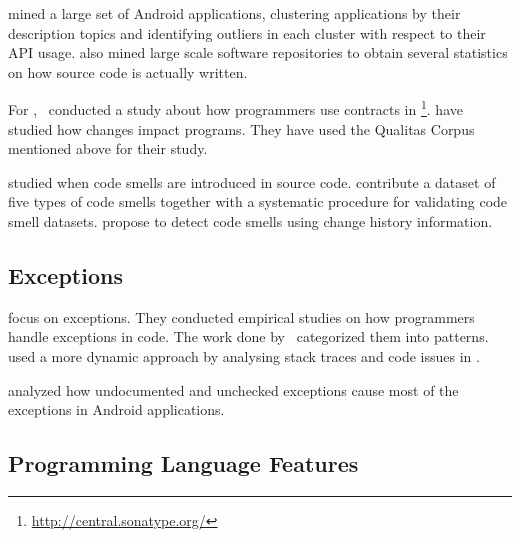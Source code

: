 \cite{gorlaCheckingAppBehavior2014} mined a large set of Android applications, clustering applications by their description topics and identifying outliers in each cluster with respect to their API usage.
\cite{grechanikEmpiricalInvestigationLargescale2010} also mined large scale software repositories to obtain several statistics on how source code is actually written.

For \java{},~\cite{dietrichContractsWildStudy2017a} conducted a study
about how programmers use contracts in \mavencentral{}\footnote{\url{http://central.sonatype.org/}}.
\cite{dietrichBrokenPromisesEmpirical2014} have studied how
\api{} changes impact \java{} programs.
They have used the Qualitas Corpus~\citep{temperoQualitasCorpusCurated2010} mentioned above for their study.

\cite{tufanoWhenWhyYour2015,tufanoWhenWhyYour2017} studied when code smells are introduced in source code.
\cite{palombaLandfillOpenDataset2015}
contribute a dataset of five types of code smells together with a systematic procedure for validating code smell datasets.
\cite{palombaDetectingBadSmells2013} propose to detect code smells using change history information.

\subsection*{Exceptions}

\cite{keryExaminingProgrammerPractices2016,asaduzzamanHowDevelopersUse2016} focus on exceptions.
They conducted empirical studies on how programmers handle exceptions in \java{} code.
The work done by~\cite{nakshatriAnalysisExceptionHandling2016} categorized them into patterns.
\cite{coelhoUnveilingExceptionHandling2015} used a more dynamic approach by analysing stack traces and code issues in \github{}.

\cite{kechagiaUndocumentedUncheckedExceptions2014} analyzed how undocumented and
unchecked exceptions cause most of the exceptions in
Android applications.

\subsection*{Programming Language Features}

